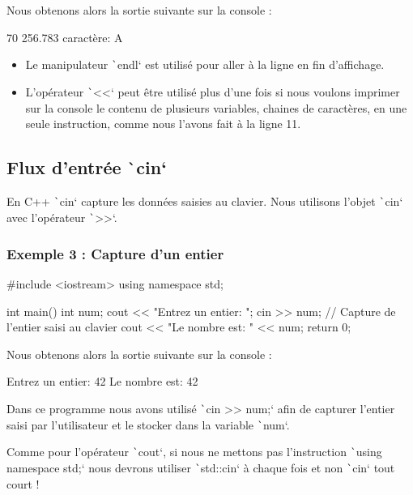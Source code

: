 \documentclass[10pt]{article}
\begin{document}
\bigskip
Nous obtenons alors la sortie suivante sur la console :
\begin{textcode}
    70
    256.783
    caractère: A
\end{textcode}

\begin{noteblock}
    \begin{itemize}
        \item Le manipulateur \texttt`endl` est utilisé pour aller à la ligne en fin d'affichage.
        \item L'opérateur \texttt`<<` peut être utilisé plus d'une fois si nous voulons imprimer sur la console le contenu de plusieurs variables, chaines de caractères, en une seule instruction, comme nous l'avons fait à la ligne 11.
    \end{itemize}
\end{noteblock}


\subsection{Flux d'entrée \texttt`cin`}
En C++ \texttt`cin` capture les données saisies au clavier. Nous utilisons l'objet \texttt`cin` avec l'opérateur \texttt`>>`.


\subsubsection{Exemple 3 : Capture d'un entier}
\begin{cppcode}
    #include <iostream>
    using namespace std;

    int main() {
        int num;
        cout << "Entrez un entier: ";
        cin >> num;   // Capture de l'entier saisi au clavier
        cout << "Le nombre est: " << num;
        return 0;
    }
\end{cppcode}

\bigskip
Nous obtenons alors la sortie suivante sur la console :

\begin{textcode}
    Entrez un entier: 42
    Le nombre est: 42
\end{textcode}

Dans ce programme nous avons utilisé \texttt`cin >> num;` afin de capturer l'entier saisi par l'utilisateur et le stocker dans la variable \texttt`num`.

\begin{noteblock}
    Comme pour l'opérateur \texttt`cout`, si nous ne mettons pas l'instruction \texttt`using namespace std;` nous devrons utiliser \texttt`std::cin` à chaque fois et non \texttt`cin` tout court !  
\end{noteblock}
\end{document}
